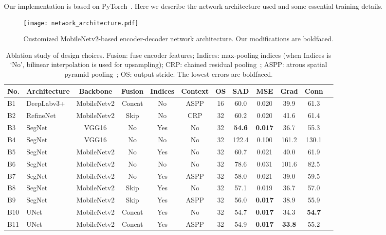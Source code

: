 \documentclass[10pt,twocolumn,letterpaper]{article}
\begin{document}
Our implementation is based on PyTorch~\cite{paszke2017automatic}. Here we describe the network architecture used and some essential training details.
\begin{figure}[!tb]
	\captionsetup{font=small,singlelinecheck=true}
	\setlength{\abovecaptionskip}{10pt}
	\centering
	\texttt{[image: network\_architecture.pdf]}\vspace{-5pt}
	\caption{Customized MobileNetv2-based encoder-decoder network architecture. Our modifications are boldfaced.}
	\label{fig:network_architecture}
\end{figure}
\begin{table*}[!t] \small
	\captionsetup{font=small,singlelinecheck=true}
	\centering
	\addtolength{\tabcolsep}{3pt}
	\renewcommand\arraystretch{1.0}
	\begin{tabular}{llccccc|ccccc}
			\hline
			No. & Architecture					& Backbone		& Fusion 	& Indices 	& Context 	& OS 	& SAD 	& MSE 	& Grad & Conn \\
			\hline
			B1	& DeepLabv3+~\cite{chen18v3}	& MobileNetv2	& Concat	& No		& ASPP		& 16	& 60.0	& 0.020	& 39.9 & 61.3 \\
			B2 	& RefineNet~\cite{lin2017refine}& MobileNetv2	& Skip 		& No 		& CRP 		& 32 	& 60.2	& 0.020	& 41.6 & 61.4 \\
			\rowcolor{mygray}
			B3 	& SegNet~\cite{xu2017deep}		& VGG16			& No		& Yes		& No		& 32	& \textbf{54.6} 	& \textbf{0.017} & 36.7 & 55.3 \\
			\rowcolor{mygray}
			B4 	& SegNet						& VGG16			& No		& No		& No		& 32	& 122.4 & 0.100 & 161.2 & 130.1 \\
			\rowcolor{mygray}
			B5 	& SegNet		 				& MobileNetv2	& No 		& Yes 		& No 		& 32	& 60.7	& 0.021	& 40.0 & 61.9 \\
			\rowcolor{mygray}
			B6 	& SegNet		 				& MobileNetv2	& No 		& No 		& No 		& 32	& 78.6  & 0.031 & 101.6& 82.5 \\
			B7 	& SegNet		 				& MobileNetv2	& No 		& Yes 		& ASPP 		& 32	& 58.0	& 0.021	& 39.0 & 59.5 \\
			B8 	& SegNet		 				& MobileNetv2	& Skip 		& Yes 		& No 		& 32	& 57.1 	& 0.019	& 36.7 & 57.0 \\
			B9 	& SegNet		 				& MobileNetv2	& Skip 		& Yes 		& ASPP 		& 32	& 56.0	& \textbf{0.017}	& 38.9 & 55.9 \\
			B10 & UNet	 						& MobileNetv2	& Concat 	& Yes 		& No 		& 32 	& 54.7	& \textbf{0.017}	& 34.3 & \textbf{54.7} \\
			B11 & UNet	 						& MobileNetv2	& Concat 	& Yes 		& ASPP 		& 32	& 54.9	& \textbf{0.017} & \textbf{33.8} & 55.2 \\
\hline
		\end{tabular}
\vspace{-8pt}
	\caption{Ablation study of design choices. Fusion: fuse encoder features; Indices: max-pooling indices (when Indices is `No', bilinear interpolation is used for upsampling); CRP: chained residual pooling~\cite{lin2017refine}; ASPP: atrous spatial pyramid pooling~\cite{chen18v3}; OS: output stride.
The lowest errors are boldfaced.}
	\label{tab:architecture}
\end{table*}
\end{document}
